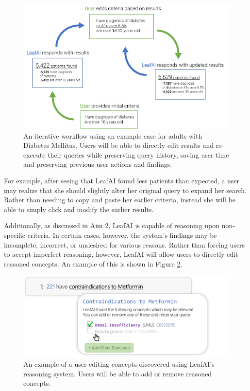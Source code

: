 \documentclass[../main.tex]{subfiles}
\begin{document}
\begin{figure}[h!]
  \centering
  \includegraphics[scale=1]{Figures/8_future_work/leafai_feedback_loop.pdf}  
  \caption{An iterative workflow using an example case for adults with Diabetes Mellitus. Users will be able to directly edit results and re-execute their queries while preserving query history, saving user time and preserving previous user actions and findings.}
\label{fig_leafai_feedback_loop}
\end{figure}

For example, after seeing that LeafAI found less patients than expected, a user may realize that she should slightly alter her original query to expand her search. Rather than needing to copy and paste her earlier criteria, instead she will be able to simply click and modify the earlier results.

Additionally, as discussed in Aim 2, LeafAI is capable of reasoning upon non-specific criteria. In certain cases, however, the system's findings may be incomplete, incorrect, or undesired for various reasons. Rather than forcing users to accept imperfect reasoning, however, LeafAI will allow users to directly edit reasoned concepts. An example of this is shown in Figure \ref{fig_leafai_edit}.

\begin{figure}[h!]
  \centering
  \includegraphics[scale=0.68]{Figures/8_future_work/leafai_edit.pdf}  
  \caption{An example of a user editing concepts discovered using LeafAI's reasoning system. Users will be able to add or remove reasoned concepts.}
\label{fig_leafai_edit}
\end{figure}
\end{document}

